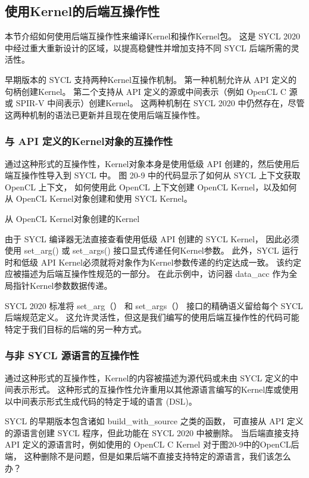 \subsection{使用Kernel的后端互操作性}
本节介绍如何使用后端互操作性来编译Kernel和操作Kernel包。 
这是 SYCL 2020 中经过重大重新设计的区域，以提高稳健性并增加支持不同 SYCL 后端所需的灵活性。

早期版本的 SYCL 支持两种Kernel互操作机制。 第一种机制允许从 API 定义的句柄创建Kernel。 
第二个支持从 API 定义的源或中间表示（例如 OpenCL C 源或 SPIR-V 中间表示）创建Kernel。 
这两种机制在 SYCL 2020 中仍然存在，尽管这两种机制的语法已更新并且现在使用后端互操作性。

\subsubsection{与 API 定义的Kernel对象的互操作性}
通过这种形式的互操作性，Kernel对象本身是使用低级 API 创建的，然后使用后端互操作性导入到 SYCL 中。 
图 20-9 中的代码显示了如何从 SYCL 上下文获取 OpenCL 上下文，
如何使用此 OpenCL 上下文创建 OpenCL Kernel，以及如何从 OpenCL Kernel对象创建和使用 SYCL Kernel。

{\color{red} 从 OpenCL Kernel对象创建的Kernel}

由于 SYCL 编译器无法直接查看使用低级 API 创建的 SYCL Kernel，
因此必须使用 set\_arg() 或 set\_args() 接口显式传递任何Kernel参数。 
此外，SYCL 运行时和低级 API Kernel必须就将对象作为Kernel参数传递的约定达成一致。 
该约定应被描述为后端互操作性规范的一部分。 在此示例中，访问器 data\_acc 作为全局指针Kernel参数数据传递。

\begin{remark}
	SYCL 2020 标准将 set\_arg（） 和 set\_args（） 接口的精确语义留给每个 SYCL 后端规范定义。
	这允许灵活性，但这是我们编写的使用后端互操作性的代码可能特定于我们目标的后端的另一种方式。
\end{remark}

\subsubsection{与非 SYCL 源语言的互操作性}
通过这种形式的互操作性，Kernel的内容被描述为源代码或未由 SYCL 定义的中间表示形式。 
这种形式的互操作性允许重用以其他源语言编写的Kernel库或使用以中间表示形式生成代码的特定于域的语言 (DSL)。

SYCL 的早期版本包含诸如 build\_with\_source 之类的函数，
可直接从 API 定义的源语言创建 SYCL 程序，但此功能在 SYCL 2020 中被删除。
当后端直接支持 API 定义的源语言时，例如使用的 OpenCL C Kernel 对于图20-9中的OpenCL后端，
这种删除不是问题，但是如果后端不直接支持特定的源语言，我们该怎么办？

